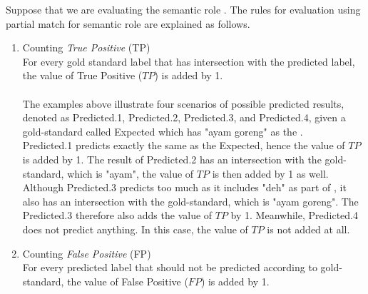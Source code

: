 Suppose that we are evaluating the semantic role \patient. The rules for evaluation using partial match for semantic role \patient are explained as follows.

\begin{enumerate}
	\item Counting \textit{True Positive} (TP)\\
	For every gold standard label that has intersection with the predicted label, the value of True Positive ($TP$) is added by 1.
	\\
	
	\\
	
	The examples above illustrate four scenarios of possible predicted results, denoted as Predicted.1, Predicted.2, Predicted.3, and Predicted.4, given a gold-standard called Expected which has "ayam goreng" as the \patient.
	\\
	
	Predicted.1 predicts exactly the same as the Expected, hence the value of $TP$ is added by 1. The result of Predicted.2 has an intersection with the gold-standard, which is "ayam", the value of $TP$ is then added by 1 as well. Although Predicted.3 predicts too much as it includes "deh" as part of \patient, it also has an intersection with the gold-standard, which is "ayam goreng". The Predicted.3 therefore also adds the value of $TP$ by 1. Meanwhile, Predicted.4 does not predict anything. In this case, the value of $TP$ is not added at all.
	\\
	
	\item Counting \textit{False Positive} (FP)\\
	For every predicted label that should not be predicted according to gold-standard, the value of False Positive ($FP$) is added by 1.
	\\
	
	\\
	

\end{enumerate}
